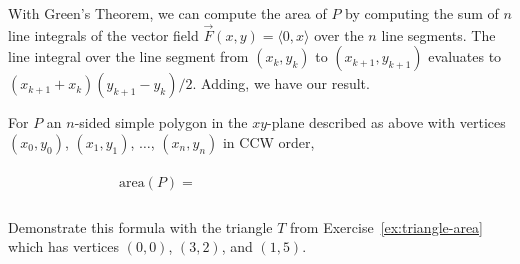 \vspace{2in} 

With Green's Theorem, we can compute the area of $P$ by computing the sum of $n$ line integrals of the vector field $\vec{F}(x,y)=\langle 0,x\rangle$ over the $n$ line segments. The line integral over the line segment from $(x_k,y_k)$ to $(x_{k+1},y_{k+1})$ evaluates to $(x_{k+1}+x_{k})(y_{k+1}-y_{k})/2$. Adding, we have our result.

\begin{thm}
    For $P$ an $n$-sided simple polygon in the $xy$-plane described as above with vertices $(x_0,y_0)$, $(x_1,y_1)$, $\dots$, $(x_n,y_n)$ in CCW order, 
    \[
        \text{area}(P) = \phantom{\sum\limits_{k=0}^{n-1} \dfrac{(x_{k+1}+x_k)(y_{k+1}-y_k)}{2}.}
    \]
\end{thm}

\bigskip 

\begin{ex}
    Demonstrate this formula with the triangle $T$ from Exercise~\ref{ex:triangle-area} which has vertices $(0,0)$, $(3,2)$, and $(1,5)$. 
\end{ex} 
\vfill 


